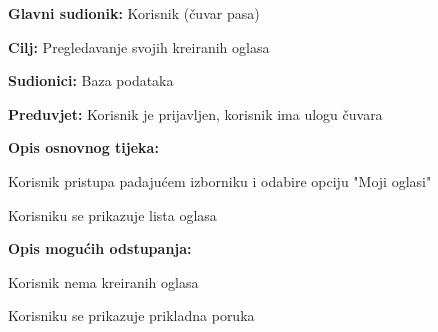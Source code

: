 					\noindent {}
					\begin{packed_item}
						
						\item \textbf{Glavni sudionik: } Korisnik (čuvar pasa)
						\item  \textbf{Cilj:} Pregledavanje svojih kreiranih oglasa
						\item  \textbf{Sudionici:} Baza podataka 
						\item  \textbf{Preduvjet:} Korisnik je prijavljen, korisnik ima ulogu čuvara
						\item  \textbf{Opis osnovnog tijeka:}
						
						\item[] \begin{packed_enum}
							
							\item Korisnik pristupa padajućem izborniku i odabire opciju "Moji oglasi"  
							\item Korisniku se prikazuje lista oglasa
							
						\end{packed_enum}
						
						\item  \textbf{Opis mogućih odstupanja:}
						
						\item[] \begin{packed_item}
							
							\item[2.a] Korisnik nema kreiranih oglasa
							\item[] \begin{packed_enum}
								
								\item Korisniku se prikazuje prikladna poruka
								
							\end{packed_enum}
						\end{packed_item}
					\end{packed_item}	
				
